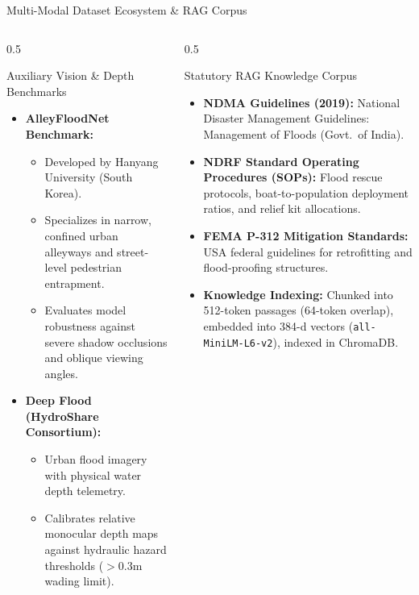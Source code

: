 \documentclass[aspectratio=169, 10pt, professionalfonts]{beamer}
\begin{document}
\begin{frame}{Multi-Modal Dataset Ecosystem \& RAG Corpus}
  \begin{columns}[T]
    \begin{column}{0.5\textwidth}
      \begin{block}{Auxiliary Vision \& Depth Benchmarks}
        \begin{itemize}\setlength{\itemsep}{0.5em}\footnotesize
          \item \textbf{AlleyFloodNet Benchmark:}
            \begin{itemize}\scriptsize
              \item Developed by Hanyang University (South Korea).
              \item Specializes in narrow, confined urban alleyways and street-level pedestrian entrapment.
              \item Evaluates model robustness against severe shadow occlusions and oblique viewing angles.
            \end{itemize}
          \item \textbf{Deep Flood (HydroShare Consortium):}
            \begin{itemize}\scriptsize
              \item Urban flood imagery with physical water depth telemetry.
              \item Calibrates relative monocular depth maps against hydraulic hazard thresholds ($>0.3\text{m}$ wading limit).
            \end{itemize}
        \end{itemize}
      \end{block}
    \end{column}
    
    \begin{column}{0.5\textwidth}
      \begin{block}{Statutory RAG Knowledge Corpus}
        \begin{itemize}\setlength{\itemsep}{0.5em}\footnotesize
          \item \textbf{NDMA Guidelines (2019):} National Disaster Management Guidelines: Management of Floods (Govt.~of India).
          \item \textbf{NDRF Standard Operating Procedures (SOPs):} Flood rescue protocols, boat-to-population deployment ratios, and relief kit allocations.
          \item \textbf{FEMA P-312 Mitigation Standards:} USA federal guidelines for retrofitting and flood-proofing structures.
          \item \textbf{Knowledge Indexing:} Chunked into 512-token passages (64-token overlap), embedded into 384-d vectors (\texttt{all-MiniLM-L6-v2}), indexed in ChromaDB.
        \end{itemize}
      \end{block}
    \end{column}
  \end{columns}
\end{frame}
\end{document}
